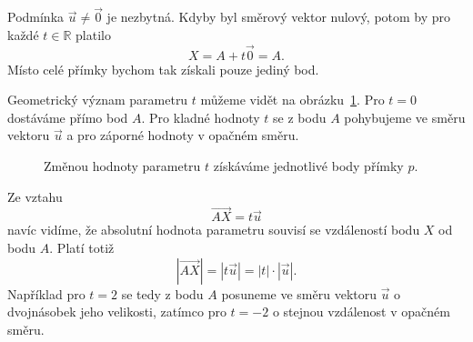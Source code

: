 Podmínka $\vec{u}\neq\vec{0}$ je nezbytná. Kdyby byl směrový vektor nulový,
potom by pro každé $t\in\mathbb{R}$ platilo
\[
    X=A+t\vec{0}=A.
\]
Místo celé přímky bychom tak získali pouze jediný bod.

Geometrický význam parametru $t$ můžeme vidět na
obrázku~\ref{fig:Parametric_line_in_space}. Pro $t=0$ dostáváme přímo bod
$A$. Pro kladné hodnoty $t$ se z bodu $A$ pohybujeme ve směru vektoru
$\vec{u}$ a pro záporné hodnoty v opačném směru.

\begin{figure}[H]
    \centering
    \caption{Změnou hodnoty parametru $t$ získáváme jednotlivé body
    přímky $p$.}
    \label{fig:Parametric_line_in_space}
\end{figure}

Ze vztahu
\[
    \overrightarrow{AX}=t\vec{u}
\]
navíc vidíme, že absolutní hodnota parametru souvisí se vzdáleností bodu
$X$ od bodu $A$. Platí totiž
\[
    |\overrightarrow{AX}|
    =
    |t\vec{u}|
    =
    |t|\cdot|\vec{u}|.
\]
Například pro $t=2$ se tedy z bodu $A$ posuneme ve směru vektoru
$\vec{u}$ o dvojnásobek jeho velikosti, zatímco pro $t=-2$ o stejnou
vzdálenost v opačném směru.

